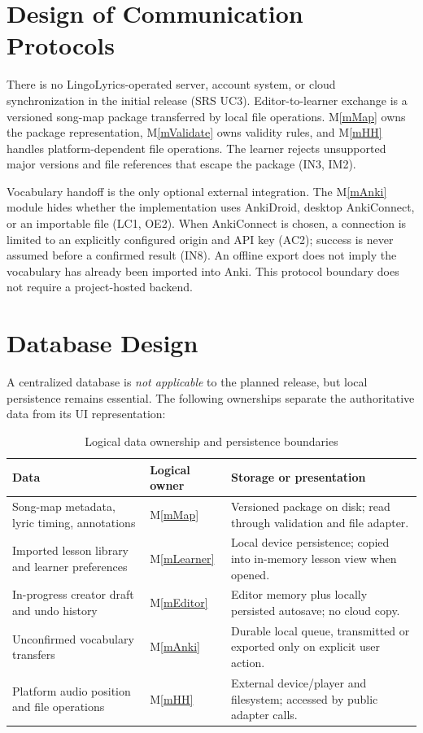 \documentclass[12pt, titlepage]{article}
\newcommand{\mref}[1]{M\ref{#1}}
\begin{document}
\section{Design of Communication Protocols} \label{SecCommunication}

There is no LingoLyrics-operated server, account system, or cloud
synchronization in the initial release (SRS UC3). Editor-to-learner
exchange is a versioned song-map package transferred by local file
operations. \mref{mMap} owns the package representation,
\mref{mValidate} owns validity rules, and \mref{mHH} handles
platform-dependent file operations. The learner rejects unsupported
major versions and file references that escape the package (IN3, IM2).

Vocabulary handoff is the only optional external integration. The
\mref{mAnki} module hides whether the implementation uses AnkiDroid,
desktop AnkiConnect, or an importable file (LC1, OE2). When AnkiConnect
is chosen, a connection is limited to an explicitly configured origin
and API key (AC2); success is never assumed before a confirmed result
(IN8). An offline export does not imply the vocabulary has already
been imported into Anki. This protocol boundary does not require a
project-hosted backend.

\section{Database Design} \label{SecDatabase}

A centralized database is \emph{not applicable} to the planned release,
but local persistence remains essential. The following ownerships
separate the authoritative data from its UI representation:

\begin{table}[H]
\centering
\begin{tabularx}{\textwidth}{@{}p{}p{}X@{}}
\toprule
\textbf{Data} & \textbf{Logical owner} & \textbf{Storage or presentation}\\
\midrule
Song-map metadata, lyric timing, annotations & \mref{mMap} &
Versioned package on disk; read through validation and file adapter.\\
Imported lesson library and learner preferences & \mref{mLearner} &
Local device persistence; copied into in-memory lesson view when opened.\\
In-progress creator draft and undo history & \mref{mEditor} &
Editor memory plus locally persisted autosave; no cloud copy.\\
Unconfirmed vocabulary transfers & \mref{mAnki} &
Durable local queue, transmitted or exported only on explicit user action.\\
Platform audio position and file operations & \mref{mHH} &
External device/player and filesystem; accessed by public adapter calls.\\
\bottomrule
\end{tabularx}
\caption{Logical data ownership and persistence boundaries}
\label{TblPersistence}
\end{table}
\end{document}

